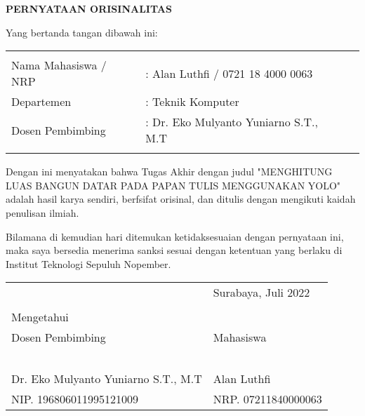 \begin{center}
  \large
  \textbf{PERNYATAAN ORISINALITAS}
\end{center}

\thispagestyle{empty}

\vspace{2ex}


\noindent Yang bertanda tangan dibawah ini:

\noindent\begin{tabularx}{\textwidth}{X X l}
  & \\
  Nama Mahasiswa / NRP &: Alan Luthfi / 0721 18 4000 0063 \\
  Departemen &: Teknik Komputer \\
  Dosen Pembimbing &: Dr. Eko Mulyanto Yuniarno S.T., M.T \\
  & \\
\end{tabularx}

Dengan ini menyatakan bahwa Tugas Akhir dengan judul "MENGHITUNG LUAS BANGUN DATAR PADA PAPAN TULIS MENGGUNAKAN YOLO" adalah hasil karya sendiri, berfsifat orisinal, dan ditulis dengan mengikuti kaidah penulisan ilmiah.

Bilamana di kemudian hari ditemukan ketidaksesuaian dengan pernyataan ini, maka saya bersedia menerima sanksi sesuai dengan ketentuan yang berlaku di Institut Teknologi Sepuluh Nopember.

\vspace{8ex}

\noindent\begin{tabularx}{\textwidth}{X l}
  & Surabaya, Juli 2022\\
  & \\
  Mengetahui & \\
  Dosen Pembimbing & Mahasiswa\\
  & \\
  & \\
  & \\
  & \\
  & \\
  Dr. Eko Mulyanto Yuniarno S.T., M.T & Alan Luthfi \\
  NIP. 196806011995121009 & NRP. 07211840000063 \\
\end{tabularx}